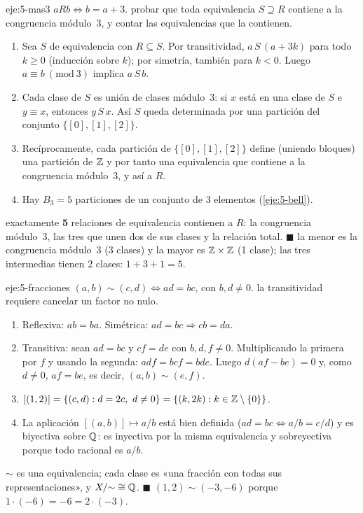 \begin{solucion}{eje:5-mas3}
\datos $aRb\iff b=a+3$.
\planteamiento probar que toda equivalencia $S\supseteq R$ contiene a la congruencia módulo~3, y contar las equivalencias que la contienen.
\pasos
\begin{enumerate}[label=\arabic*.]
  \item Sea $S$ de equivalencia con $R\subseteq S$. Por transitividad, $a\,S\,(a+3k)$ para todo $k\ge0$ (inducción sobre $k$); por simetría, también para $k<0$. Luego $a\equiv b\ (\mathrm{mod}\ 3)$ implica $a\,S\,b$.
  \item Cada clase de $S$ es unión de clases módulo~3: si $x$ está en una clase de $S$ e $y\equiv x$, entonces $y\,S\,x$. Así $S$ queda determinada por una partición del conjunto $\{[0],[1],[2]\}$.
  \item Recíprocamente, cada partición de $\{[0],[1],[2]\}$ define (uniendo bloques) una partición de $\mathbb{Z}$ y por tanto una equivalencia que contiene a la congruencia módulo~3, y así a $R$.
  \item Hay $B_3=5$ particiones de un conjunto de 3 elementos (\cref{eje:5-bell}).
\end{enumerate}
\resultado exactamente \textbf{5} relaciones de equivalencia contienen a $R$: la congruencia módulo~3, las tres que unen dos de sus clases y la relación total. \hfill$\blacksquare$
\comprobacion la menor es la congruencia módulo~3 (3 clases) y la mayor es $\mathbb{Z}\times\mathbb{Z}$ (1 clase); las tres intermedias tienen 2 clases: $1+3+1=5$.
\end{solucion}

\begin{solucion}{eje:5-fracciones}
\datos $(a,b)\sim(c,d)\iff ad=bc$, con $b,d\neq0$.
\planteamiento la transitividad requiere cancelar un factor no nulo.
\pasos
\begin{enumerate}[label=\arabic*.]
  \item Reflexiva: $ab=ba$. Simétrica: $ad=bc\Rightarrow cb=da$.
  \item Transitiva: sean $ad=bc$ y $cf=de$ con $b,d,f\neq0$. Multiplicando la primera por $f$ y usando la segunda: $adf=bcf=bde$. Luego $d(af-be)=0$ y, como $d\neq0$, $af=be$, es decir, $(a,b)\sim(e,f)$.
  \item $[(1,2)]=\{(c,d): d=2c,\ d\neq0\}=\{(k,2k): k\in\Z\setminus\{0\}\}$.
  \item La aplicación $[(a,b)]\mapsto a/b$ está bien definida ($ad=bc\iff a/b=c/d$) y es biyectiva sobre $\mathbb{Q}$: es inyectiva por la misma equivalencia y sobreyectiva porque todo racional es $a/b$.
\end{enumerate}
\resultado $\sim$ es una equivalencia; cada clase es «una fracción con todas sus representaciones», y $X/{\sim}\cong\mathbb{Q}$. \hfill$\blacksquare$
\comprobacion $(1,2)\sim(-3,-6)$ porque $1\cdot(-6)=-6=2\cdot(-3)$.
\end{solucion}

